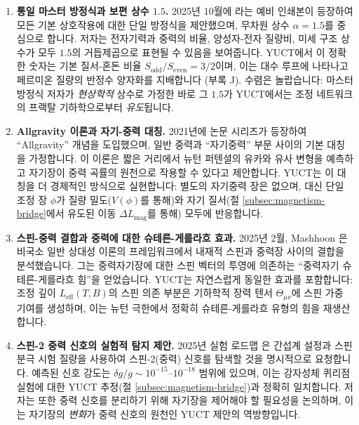 \documentclass[11pt,a4paper]{article}
\begin{document}
	\begin{enumerate}
		
		\item \textbf{통일 마스터 방정식과 보편 상수 $1.5$.} 2025년 10월에 \cite{UnifiedMaster2025}라는 예비 인쇄본이 등장하여 모든 기본 상호작용에 대한 단일 방정식을 제안했으며, 무차원 상수 $\alpha = 1.5$를 중심으로 합니다. 저자는 전자기력과 중력의 비율, 양성자-전자 질량비, 미세 구조 상수가 모두 $1.5$의 거듭제곱으로 표현될 수 있음을 보여줍니다. YUCT에서 이 정확한 숫자는 기본 질서-혼돈 비율 $S_{\mathrm{odd}}/S_{\mathrm{even}} = 3/2$이며, 이는 대수 루프에 나타나고 페르미온 질량의 반정수 양자화를 지배합니다 (부록 J). 수렴은 놀랍습니다: 마스터 방정식 저자가 \emph{현상학적} 상수로 가정한 바로 그 $1.5$가 YUCT에서는 조정 네트워크의 프랙탈 기하학으로부터 \emph{유도}됩니다.
		
		\item \textbf{Allgravity 이론과 자기-중력 대칭.} 2021년에 \cite{Allgravity2021} 논문 시리즈가 등장하여 ``Allgravity'' 개념을 도입했으며, 일반 중력과 ``자기중력'' 부문 사이의 기본 대칭을 가정합니다. 이 이론은 짧은 거리에서 뉴턴 퍼텐셜의 유카와 유사 변형을 예측하고 자기장이 중력 곡률의 원천으로 작용할 수 있다고 제안합니다. YUCT는 이 대칭을 더 경제적인 방식으로 실현합니다: 별도의 자기중력 장은 없으며, 대신 단일 조정 장 $\phi$가 질량 밀도($V(\phi)$를 통해)와 자기 질서(절 \ref{subsec:magnetism-bridge}에서 유도된 이동 $\Delta L_{\mathrm{mag}}$를 통해) 모두에 반응합니다.
		
		\item \textbf{스핀-중력 결합과 중력에 대한 슈테른-게를라흐 효과.} 2025년 2월, Mashhoon \cite{Mashhoon2025}은 비국소 일반 상대성 이론의 프레임워크에서 내재적 스핀과 중력장 사이의 결합을 분석했습니다. 그는 중력자기장에 대한 스핀 벡터의 투영에 의존하는 ``중력자기 슈테른-게를라흐 힘''을 얻었습니다. YUCT는 자연스럽게 동일한 효과를 포함합니다: 조정 깊이 $L_{\mathrm{eff}}(T,B)$의 스핀 의존 부분은 기하학적 장력 텐서 $\Theta_{\mu\nu}$에 스핀 가중 기여를 생성하며, 이는 뉴턴 극한에서 정확히 슈테른-게를라흐 유형의 힘을 재생산합니다.
		
		\item \textbf{스핀-2 중력 신호의 실험적 탐지 제안.} 2025년 실험 로드맵 \cite{Spin2Proposal2025}은 간섭계 설정과 스핀 분극 시험 질량을 사용하여 스핀-2(중력) 신호를 탐색할 것을 명시적으로 요청합니다. 예측된 신호 강도는 $\delta g / g \sim 10^{-15}$–$10^{-18}$ 범위에 있으며, 이는 강자성체 퀴리점 실험에 대한 YUCT 추정(절 \ref{subsec:magnetism-bridge})과 정확히 일치합니다. 저자는 또한 중력 신호를 분리하기 위해 자기장을 제어해야 할 필요성을 논의하며, 이는 자기장의 \emph{변화}가 중력 신호의 원천인 YUCT 제안의 역방향입니다.
		

\end{enumerate}
\end{document}
